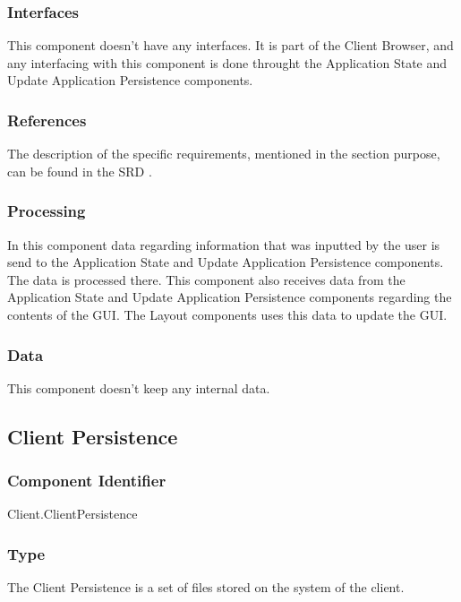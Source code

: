 \subsubsection*{Interfaces}
This component doesn't have any interfaces. It is part of the Client Browser, and any interfacing with this component is done throught the Application State and Update Application Persistence components.

\subsubsection*{References}
The description of the specific requirements, mentioned in the section purpose, can be found in the SRD \cite{srd}.

\subsubsection*{Processing}
In this component data regarding information that was inputted by the user is send to the Application State and Update Application Persistence components. The data is processed there. This component also receives data from the Application State and Update Application Persistence components regarding the contents of the GUI. The Layout components uses this data to update the GUI.

\subsubsection*{Data}
This component doesn't keep any internal data.

\subsection{Client Persistence}

\subsubsection*{Component Identifier}
Client.ClientPersistence

\subsubsection*{Type}
The Client Persistence is a set of files stored on the system of the client.

